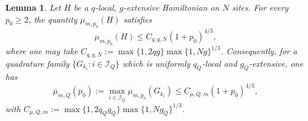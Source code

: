 \documentclass[10pt,reqno]{article}
\numberwithin{equation}{section}
\theoremstyle{plain}
\newtheorem{lem}[thm]{Lemma}
\theoremstyle{definition}
\begin{document}
\begin{lem}\label{loc-mu-growth-envelope}
Let \(H\) be a \(q\)-local, \(g\)-extensive Hamiltonian on \(N\) sites. For every \(p_0\geq2\), the quantity \(\mu_{m,p_0}(H)\) satisfies
\begin{equation}
\mu_{m,p_0}(H) \leq C_{q,g,N}(1+p_0)^{4/3},
\label{eq:local-growth-envelope-from-mizuta}
\end{equation}
where one may take $C_{q,g,N} := \max\{1,2qg\}\max\{1,Ng\}^{1/3}$. Consequently, for a quadrature family \(\{G_{k_i}:i\in \mathcal I_Q\}\) which is uniformly \(q_Q\)-local and \(g_Q\)-extensive, one has
\begin{equation}
\overline\mu_{m,Q}(p_0) := \max_{i\in \mathcal I_Q}\mu_{m,p_0}(G_{k_i}) \leq C_{\mu,Q,m}(1+p_0)^{4/3},
\label{eq:mubar-local-growth-envelope-from-mizuta}
\end{equation}
with $C_{\mu,Q,m} := \max\{1,2q_Q g_Q\}\max\{1,Ng_Q\}^{1/3}$. 
\end{lem}
\end{document}
